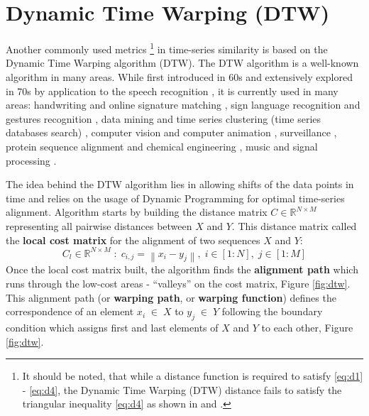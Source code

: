 \section{Dynamic Time Warping (DTW)}
Another commonly used metrics 
\footnote{It should be noted, that while a distance function is required to satisfy \ref{eq:d1} - \ref{eq:d4}, the Dynamic Time Warping (DTW) distance fails to satisfy the triangular inequality \ref{eq:d4} as shown in \cite{citeulike:4343286} and \cite{citeulike:4343933}.}
in time-series similarity is based on the Dynamic Time Warping algorithm (DTW). The DTW algorithm is a well-known algorithm in many areas. While first introduced in 60s \cite{citeulike:3733907} and extensively explored in 70s by application to the speech recognition \cite{citeulike:603020}, \cite{citeulike:3496861} it is currently used in many areas: handwriting and online signature matching \cite{citeulike:2838910} \cite{citeulike:2584345}, sign language recognition \cite{citeulike:3789957} and gestures recognition \cite{citeulike:3789964} \cite{citeulike:3789957}, data mining and time series clustering (time series databases search) \cite{citeulike:3815076} \cite{citeulike:3733893} \cite{citeulike:3788783} \cite{citeulike:3731715} \cite{citeulike:3731713} \cite{citeulike:3789897}, computer vision and computer animation \cite{citeulike:3728229}, surveillance \cite{citeulike:964832}, protein sequence alignment and chemical engineering \cite{citeulike:3733894}, music and signal processing \cite{citeulike:3736775} \cite{citeulike:3728229} \cite{citeulike:3728228}.

The idea behind the DTW algorithm lies in allowing shifts of the data points in time and relies on the usage of Dynamic Programming \cite{citeulike:3733907} for optimal time-series alignment. Algorithm starts by building the distance matrix $C \in \mathbb{R}^{N \times M}$ representing all pairwise distances between $X$ and $Y$. This distance matrix called the \textbf{local cost matrix} for the alignment of two sequences $X$ and $Y$:
\begin{equation}
\label{eq:localcost}
C_{l} \in \mathbb{R}^{N \times M} \; : \; c_{i,j} = \left\| x_{i} - y_{j} \right\|, \; i \in [1:N], \; j \in [1:M]
\end{equation}
Once the local cost matrix built, the algorithm finds the \textbf{alignment path} which runs through the low-cost areas - ``valleys'' on the cost matrix, Figure \ref{fig:dtw}. This alignment path (or \textbf{warping path}, or \textbf{warping function}) defines the correspondence of an element $x_{i} \; \in \; X$ to $y_{j} \; \in \; Y$ following the boundary condition which assigns first and last elements of $X$ and $Y$ to each other, Figure \ref{fig:dtw}.


